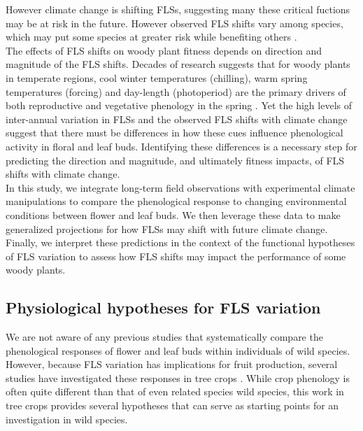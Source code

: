 \documentclass[11pt]{article}
\begin{document}
\noindent However climate change is shifting FLSs, suggesting many these critical fuctions may be at risk in the future.   However observed FLS shifts vary among species, which may put some species at greater risk while benefiting others \citep{Buonaiuto2020}.\\ 

\noindent The effects of FLS shifts on woody plant fitness depends on direction and magnitude of the FLS shifts.
\noindent Decades of research suggests that for woody plants in temperate regions, cool winter temperatures (chilling), warm spring temperatures (forcing) and day-length (photoperiod) are the primary drivers of both reproductive and vegetative phenology in the spring \citep{Forrest2018,Flynn2018}. Yet the high levels of inter-annual variation in FLSs and the observed FLS shifts with climate change suggest that there must be differences in how these cues influence phenological activity in floral and leaf buds. Identifying these differences is a necessary step for predicting the direction and magnitude, and ultimately fitness impacts, of FLS shifts with climate change. \\

\noindent In this study, we integrate long-term field observations with experimental climate manipulations to compare the phenological response to changing environmental conditions between flower and leaf buds. We then leverage these data to make generalized projections for how FLSs may shift with future climate change. Finally, we interpret these predictions in the context of the functional hypotheses of FLS variation to assess how FLS shifts may impact the performance of some woody plants.\\  

\subsection*{Physiological hypotheses for FLS variation}
\noindent We are not aware of any previous studies that systematically compare the phenological responses of flower and leaf buds within individuals of wild species. However, because FLS variation has implications for fruit production, several studies have investigated these responses in tree crops \citep[see][]{Guo_2014,Garigalio2016,Citadin2001}. While crop phenology is often quite different than that of even related species wild species, this work in tree crops provides several hypotheses that can serve as starting points for an investigation in wild species.\\
\end{document}
